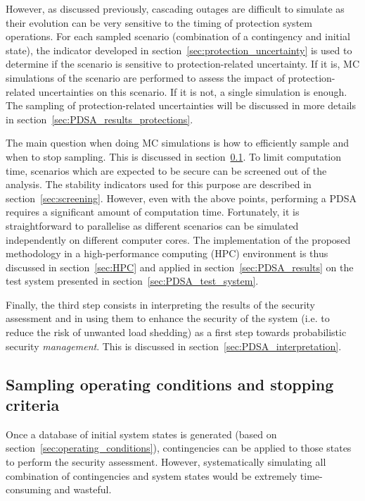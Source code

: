 However, as discussed previously, cascading outages are difficult to simulate as their evolution can be very sensitive to the timing of protection system operations. For each sampled scenario (combination of a contingency and initial state), the indicator developed in section~\ref{sec:protection_uncertainty} is used to determine if the scenario is sensitive to protection-related uncertainty. If it is, MC simulations of the scenario are performed to assess the impact of protection-related uncertainties on this scenario. If it is not, a single simulation is enough. The sampling of protection-related uncertainties will be discussed in more details in section~\ref{sec:PDSA_results_protections}.

The main question when doing MC simulations is how to efficiently sample and when to stop sampling. This is discussed in section~\ref{sec:sampling}. To limit computation time, scenarios which are expected to be secure can be screened out of the analysis. The stability indicators used for this purpose are described in section~\ref{sec:screening}. However, even with the above points, performing a PDSA requires a significant amount of computation time. Fortunately, it is straightforward to parallelise as different scenarios can be simulated independently on different computer cores. The implementation of the proposed methodology in a high-performance computing (HPC) environment is thus discussed in section~\ref{sec:HPC} and applied in section~\ref{sec:PDSA_results} on the test system presented in section~\ref{sec:PDSA_test_system}.

Finally, the third step consists in interpreting the results of the security assessment and in using them to enhance the security of the system (i.e. to reduce the risk of unwanted load shedding) as a first step towards probabilistic security \emph{management}. This is discussed in section~\ref{sec:PDSA_interpretation}.


\subsection{Sampling operating conditions and stopping criteria}
\label{sec:sampling}

Once a database of initial system states is generated (based on section~\ref{sec:operating_conditions}), contingencies can be applied to those states to perform the security assessment. However, systematically simulating all combination of contingencies and system states would be extremely time-consuming and wasteful.

